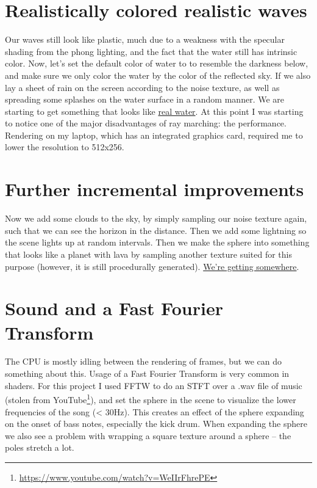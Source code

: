 \documentclass[abstract=off,oneside]{scrreprt}
\begin{document}
\section*{Realistically colored realistic waves}
\label{sec-10}
\label{sec:realisticcolor}
Our waves still look like plastic, much due to a weakness with the
specular shading from the phong lighting, and the fact that the water
still has intrinsic color. Now, let's set the default color of water
to to resemble the darkness below, and make sure we only color the
water by the color of the reflected sky. If we also lay a sheet of
rain on the screen according to the noise texture, as well as
spreading some splashes on the water surface in a random manner. We
are starting to get something that looks like \hyperref[fig:okwater]{real water}. At this
point I was starting to notice one of the major disadvantages of ray
marching: the performance. Rendering on my laptop, which has an
integrated graphics card, required me to lower the resolution to
512x256.

\section*{Further incremental improvements}
\label{sec-11}
\label{sec:furtherimprovements}
Now we add some clouds to the sky, by simply sampling our noise
texture again, such that we can see the horizon in the distance. Then
we add some lightning so the scene lights up at random intervals. Then
we make the sphere into something that looks like a planet with lava
by sampling another texture suited for this purpose (however, it is
still procedurally generated). \hyperref[fig:improvements]{We're getting somewhere}.

\section*{Sound and a Fast Fourier Transform}
\label{sec-12}
\label{sec:sound}
The CPU is mostly idling between the rendering of frames, but we can
do something about this. Usage of a Fast Fourier Transform is very
common in shaders. For this project I used FFTW to do an STFT over a
.wav file of music (stolen from YouTube\footnote{\url{https://www.youtube.com/watch?v=WeIIrFhrePE}}), and set the sphere in the
scene to visualize the lower frequencies of the song (< 30Hz). This
creates an effect of the sphere expanding on the onset of bass notes,
especially the kick drum. When expanding the sphere we also see a
problem with wrapping a square texture around a sphere -- the poles
stretch a lot.
\end{document}
